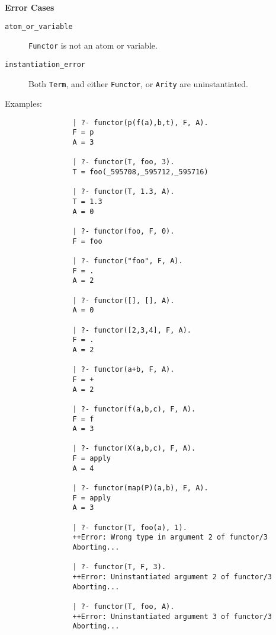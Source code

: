 \begin{description}
{\bf Error Cases}
    \begin{description}
    \item[{\tt atom\_or\_variable}]
	{\tt Functor} is not an atom or variable.
    \item[{\tt instantiation\_error}]
	Both {\tt Term}, and either {\tt Functor}, or {\tt Arity} are 
	uninstantiated.
    \end{description}

    Examples:
    {\footnotesize
     \begin{verbatim}
                | ?- functor(p(f(a),b,t), F, A).
                F = p
                A = 3

                | ?- functor(T, foo, 3).
                T = foo(_595708,_595712,_595716)

                | ?- functor(T, 1.3, A).
                T = 1.3
                A = 0

                | ?- functor(foo, F, 0).
                F = foo

                | ?- functor("foo", F, A).
                F = .
                A = 2

                | ?- functor([], [], A).
                A = 0

                | ?- functor([2,3,4], F, A).
                F = .
                A = 2

                | ?- functor(a+b, F, A).
                F = +
                A = 2

                | ?- functor(f(a,b,c), F, A).
                F = f
                A = 3

                | ?- functor(X(a,b,c), F, A).
                F = apply
                A = 4

                | ?- functor(map(P)(a,b), F, A).
                F = apply
                A = 3

                | ?- functor(T, foo(a), 1).
                ++Error: Wrong type in argument 2 of functor/3
                Aborting...

                | ?- functor(T, F, 3).
                ++Error: Uninstantiated argument 2 of functor/3
                Aborting...

                | ?- functor(T, foo, A).
                ++Error: Uninstantiated argument 3 of functor/3
                Aborting...
     \end{verbatim}}


\end{description}
